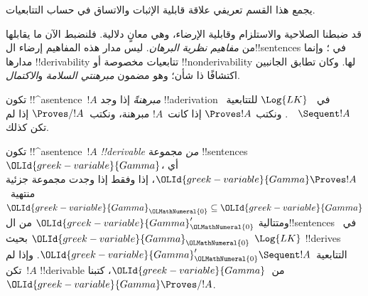 \documentclass[../../../include/open-logic-section]{subfiles}
\begin{document}
\begin{editorial}
  يجمع هذا القسم تعريفي علاقة قابلية الإثبات والاتساق في حساب
  التتابعيات.
\end{editorial}

      {}
      {}


\begin{explain}
قد ضبطنا الصلاحية والاستلزام وقابلية الإرضاء، وهي معانٍ دلالية. فلنضبط الآن ما يقابلها من
\emph{مفاهيم نظرية البرهان}. ليس مدار هذه المفاهيم إرضاء ال!!{sentence}s في
؛ وإنما مدارها
!!{derivability} تتابعيات مخصوصة أو
!!{nonderivability} لها. وكان تطابق الجانبين اكتشافًا ذا شأن؛ وهو مضمون
\emph{مبرهنتي السلامة} و\emph{الاكتمال}.
\end{explain}

\begin{defn}[المبرهنات]
تكون !!^a{sentence}~$!A$ \emph{مبرهنةً} إذا وجد !!a{derivation} في
~$\Log{LK}$ للتتابعية~$\quad \Sequent !A$. ونكتب $\Proves !A$ إذا
كانت~$!A$ مبرهنة، ونكتب~$\Proves/ !A$ إذا لم تكن كذلك.
\end{defn}

\begin{defn}[!!^{derivability}]
تكون !!^a{sentence}~$!A$ \emph{!!{derivable} من} مجموعة
!!{sentence}s~${\OLId{greek-variable}{Gamma}}$، أي ${\OLId{greek-variable}{Gamma}} \Proves !A$، إذا وفقط إذا وجدت
مجموعة جزئية منتهية~${\OLId{greek-variable}{Gamma}}_{\OLMathNumeral{0}} \subseteq {\OLId{greek-variable}{Gamma}}$ ومتتالية
${\OLId{greek-variable}{Gamma}}_{\OLMathNumeral{0}}'$ من ال!!{sentence}s في~${\OLId{greek-variable}{Gamma}}_{\OLMathNumeral{0}}$ بحيث
$\Log{LK}$ !!{derive}s التتابعية~${\OLId{greek-variable}{Gamma}}_{\OLMathNumeral{0}}' \Sequent !A$. وإذا لم
تكن~$!A$ !!{derivable} من~${\OLId{greek-variable}{Gamma}}$، كتبنا ${\OLId{greek-variable}{Gamma}} \Proves/ !A$.
\end{defn}
\end{document}
